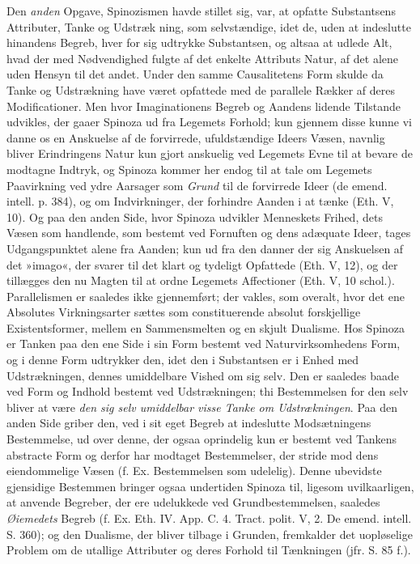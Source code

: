 \documentclass[12pt,a4paper]{book}
\newcommand{\opage}[1]{\marginnote{\footnotesize\textit{[#1]}}}
\begin{document}
Den \emph{anden} Opgave, Spinozismen havde stillet sig,
var, at opfatte Substantsens Attributer, Tanke og Udstræk\-%
\opage{178}ning, som selvstændige, idet de, uden at indeslutte hinandens
Begreb, hver for sig udtrykke Substantsen, og altsaa at
udlede Alt, hvad der med Nødvendighed fulgte af det enkelte
Attributs Natur, af det alene uden Hensyn til det andet.
Under den samme Causalitetens Form skulde da Tanke og
Udstrækning have været opfattede med de parallele Rækker
af deres Modificationer. Men hvor Imaginationens Begreb
og Aandens lidende Tilstande udvikles, der gaaer Spinoza
ud fra Legemets Forhold; kun gjennem disse kunne vi danne
os en Anskuelse af de forvirrede, ufuldstændige Ideers Væsen,
navnlig bliver Erindringens Natur kun gjort anskuelig ved
Legemets Evne til at bevare de modtagne Indtryk, og Spinoza
kommer her endog til at tale om Legemets Paavirkning
ved ydre Aarsager som \emph{Grund} til de forvirrede Ideer
(de emend. intell. p. 384), og om Indvirkninger, der forhindre
Aanden i at tænke (Eth. V, 10). Og paa den anden Side,
hvor Spinoza udvikler Menneskets Frihed, dets Væsen som
handlende, som bestemt ved Fornuften og dens adæquate
Ideer, tages Udgangspunktet alene fra Aanden; kun ud fra
den danner der sig Anskuelsen af det »imago«, der svarer
til det klart og tydeligt Opfattede (Eth. V, 12), og der tillægges
den nu Magten til at ordne Legemets Affectioner
(Eth. V, 10 schol.). Parallelismen er saaledes ikke gjennemført;
der vakles, som overalt, hvor det ene Absolutes Virkningsarter
sættes som constituerende absolut forskjellige
Existentsformer, mellem en Sammensmelten og en skjult
Dualisme. Hos Spinoza er Tanken paa den ene Side i sin
Form bestemt ved Naturvirksomhedens Form, og i denne
Form udtrykker den, idet den i Substantsen er i Enhed med
Udstrækningen, dennes umiddelbare Vished om sig selv.
Den er saaledes baade ved Form og Indhold bestemt ved
Udstrækningen; thi Bestemmelsen for den selv bliver at
være \emph{den sig selv umiddelbar visse Tanke om Udstrækningen}.
Paa den anden Side griber den, ved i sit
eget Begreb at indeslutte Modsætningens Bestemmelse, ud
over denne, der ogsaa oprindelig kun er bestemt ved Tankens
abstracte Form og derfor har modtaget Bestemmelser,
\opage{179} \setcounter{footnote}{0}%
der stride mod dens eiendommelige Væsen (f. Ex. Bestemmelsen
som udelelig). Denne ubevidste gjensidige Bestemmen
bringer ogsaa undertiden Spinoza til, ligesom uvilkaarligen,
at anvende Begreber, der ere udelukkede ved Grundbestemmelsen,
saaledes \emph{Øiemedets} Begreb (f. Ex. Eth. IV.
App. C. 4. Tract. polit. V, 2. De emend. intell. S. 360);
og den Dualisme, der bliver tilbage i Grunden, fremkalder
det uopløselige Problem om de utallige Attributer og deres
Forhold til Tænkningen (jfr. S. 85 f.).
\end{document}
